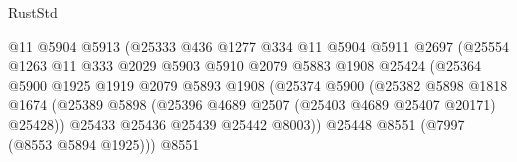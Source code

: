 \begin{lexlean}{RustStd}
\begin{coremodule}
                                      @11
                                      @5904
                                      @5913
                                      (@25333
                                        @436
                                        @1277
                                        @334
                                        @11
                                        @5904
                                        @5911
                                        @2697
                                        (@25554
                                          @1263
                                          @11
                                          @333
                                          @2029
                                          @5903
                                          @5910
                                          @2079
                                          @5883
                                          @1908
                                          @25424
                                          (@25364
                                            @5900
                                            @1925
                                            @1919
                                            @2079
                                            @5893
                                            @1908
                                            (@25374
                                              @5900
                                              (@25382
                                                @5898
                                                @1818
                                                @1674
                                                (@25389
                                                  @5898
                                                  (@25396
                                                    @4689
                                                    @2507
                                                    (@25403 @4689 @25407 @20171)
                                                    @25428))
                                                @25433
                                                @25436
                                                @25439
                                                @25442
                                                @8003))
                                            @25448
                                            @8551
                                            (@7997 (@8553 @5894 @1925)))
                                          @8551

\end{coremodule}
\end{lexlean}
